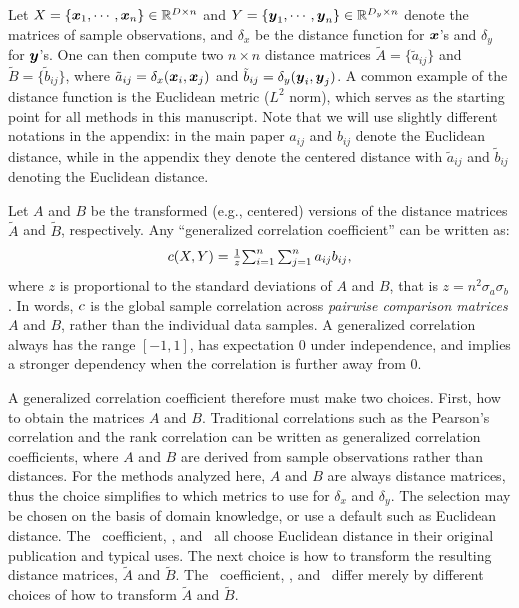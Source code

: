\documentclass[11pt]{extarticle}
\begin{document}
Let $X=\{\boldsymbol{x}_{1},\cdots, \boldsymbol{x}_{n}\} \in \mathbb{R}^{D \times n}$ and $Y=\{\boldsymbol{y}_{1},\cdots, \boldsymbol{y}_{n}\} \in \mathbb{R}^{D_y \times n}$ denote the matrices of sample observations, and $\delta_x$ be the distance function for $\boldsymbol{x}$'s and $\delta_y$ for $\boldsymbol{y}$'s.
One can then compute two $n \times n$ distance matrices $\tilde{A}=\{\tilde{a}_{ij}\}$ and $\tilde{B}=\{\tilde{b}_{ij}\}$, where $\tilde{a}_{ij}=\delta_x(\boldsymbol{x}_i,\boldsymbol{x}_j)$ and $\tilde{b}_{ij}=\delta_y(\boldsymbol{y}_i,\boldsymbol{y}_j)$. A common example of the distance function is the Euclidean metric ($L^{2}$ norm), which serves as the starting point for all methods in this manuscript. Note that we will use slightly different notations in the appendix: in the main paper $a_{ij}$ and $b_{ij}$ denote the Euclidean distance, while in the appendix they denote the centered distance with $\tilde{a}_{ij}$ and $\tilde{b}_{ij}$ denoting the Euclidean distance.

Let $A$ and $B$ be the transformed (e.g., centered) versions of the distance matrices $\tilde{A}$ and $\tilde{B}$, respectively. Any ``generalized correlation coefficient''  \cite{Spearman1904,KendallBook} can be written as:
\begin{equation}
\label{generalCoef}
c(X,Y)= \tfrac{1}{z} {\textstyle \sum_{i=1}^n \sum_{j=1}^n a_{ij} b_{ij}},
\end{equation}
where $z$ is proportional to the standard deviations of $A$ and $B$, that is $z=n^2\sigma_a \sigma_b$.
In words, $c$ is the global sample correlation across \emph{pairwise comparison matrices} $A$ and $B$, rather than the individual data samples.
A generalized correlation always has the range $[-1,1]$, has expectation $0$ under independence, and implies a stronger dependency when the correlation is further away from $0$.

A generalized correlation coefficient therefore must make two choices. First, how to obtain the matrices $A$ and $B$.  Traditional correlations such as the Pearson's correlation and the rank correlation can be written as generalized correlation coefficients, where $A$ and $B$ are derived from sample observations rather than distances. For the methods analyzed here, $A$ and $B$ are always distance matrices, thus the choice simplifies to  which metrics to use for $\delta_x$ and $\delta_y$.  The selection may be chosen on the basis of domain knowledge, or use a default such as Euclidean distance.  The \Mantel~coefficient, \Dcorr, and \Mcorr~all choose Euclidean distance in their original publication and typical uses.
The next choice is how to transform the resulting distance matrices, $\tilde{A}$ and $\tilde{B}$.
The \Mantel~coefficient, \Dcorr, and \Mcorr~differ merely by different choices of how to transform $\tilde{A}$ and $\tilde{B}$.
\end{document}
